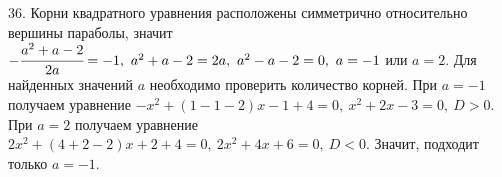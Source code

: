 36. Корни квадратного уравнения расположены симметрично относительно вершины параболы, значит $-\cfrac{a^2+a-2}{2a}=-1,\ a^2+a-2=2a,\ a^2-a-2=0,\ a=-1$ или $a=2.$ Для найденных значений $a$ необходимо проверить количество корней. При $a=-1$ получаем уравнение $-x^2+(1-1-2)x-1+4=0,\ x^2+2x-3=0,\ D>0.$ При $a=2$ получаем уравнение $2x^2+(4+2-2)x+2+4=0,\ 2x^2+4x+6=0,\ D<0.$ Значит, подходит только $a=-1.$\\
